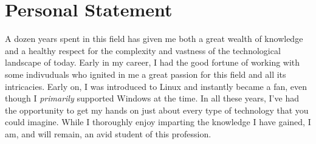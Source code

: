 \documentclass[]{twentysecondcv}
\begin{document}
\section{Personal Statement}
A dozen years spent in this field has given me both a great wealth of knowledge and a healthy respect for the complexity and vastness of the technological landscape of today. Early in my career, I had the good fortune of working with some indivuduals who ignited in me a great passion for this field and all its intricacies. Early on, I was introduced to Linux and instantly became a fan, even though I \emph{primarily} supported Windows at the time. In all these years, I've had the opportunity to get my hands on just about every type of technology that you could imagine. While I thoroughly enjoy imparting the knowledge I have gained, I am, and will remain, an avid student of this profession.

\end{document}
